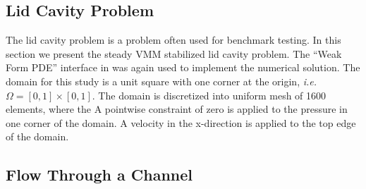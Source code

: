 \subsection{Lid Cavity Problem}
The lid cavity problem \cite{masud2009variational} is a problem often used for benchmark testing. In this section we present the steady \ac{VMM} stabilized lid cavity problem. The ``Weak Form PDE'' interface in \comsol was again used to implement the numerical solution. The domain for this study is a unit square with one corner at the origin, \textit{i.e.} $\Omega =[0,1]\times[0,1]$. The domain is discretized into uniform mesh of 1600 elements, where the  A pointwise constraint of zero is applied to the pressure in one corner of the domain. A velocity in the x-direction is applied to the top edge of the domain. 
\subsection{Flow Through a Channel}